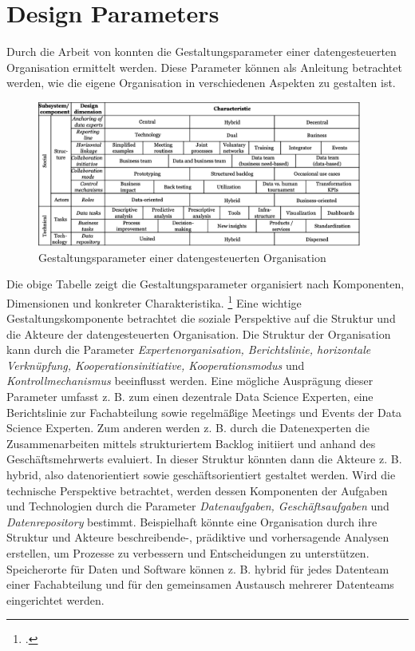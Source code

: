 \section{Design Parameters}

Durch die Arbeit von  konnten die Gestaltungsparameter einer datengesteuerten Organisation ermittelt werden.
Diese Parameter können als Anleitung betrachtet werden, wie die eigene Organisation in verschiedenen Aspekten zu gestalten ist.

\begin{figure}[htb]
    \centering
    \includegraphics[width=0.95\textwidth]{graphics/DDO_design.png}
    \caption{Gestaltungsparameter einer datengesteuerten Organisation}
    \label{fig:DDOs design}
\end{figure}

Die obige Tabelle zeigt die Gestaltungsparameter organisiert nach Komponenten, Dimensionen und konkreter Charakteristika. \footcite[Vgl.][S. 5]{JanineAdinaHagen.2020}
Eine wichtige Gestaltungskomponente betrachtet die soziale Perspektive auf die Struktur und die Akteure der datengesteuerten Organisation.
Die Struktur der Organisation kann durch die Parameter \textit{Expertenorganisation, Berichtslinie, horizontale Verknüpfung, Kooperationsinitiative, Kooperationsmodus} und \textit{Kontrollmechanismus} beeinflusst werden.
Eine mögliche Ausprägung dieser Parameter umfasst z. B. zum einen dezentrale Data Science Experten, eine Berichtslinie zur Fachabteilung sowie regelmäßige Meetings und Events der Data Science Experten.
Zum anderen werden z. B. durch die Datenexperten die Zusammenarbeiten mittels strukturiertem Backlog initiiert und anhand des Geschäftsmehrwerts evaluiert.
In dieser Struktur könnten dann die Akteure z. B. hybrid, also datenorientiert sowie geschäftsorientiert gestaltet werden.
Wird die technische Perspektive betrachtet, werden dessen Komponenten der Aufgaben und Technologien durch die Parameter \textit{Datenaufgaben, Geschäftsaufgaben} und \textit{Datenrepository} bestimmt.
Beispielhaft könnte eine Organisation durch ihre Struktur und Akteure beschreibende-, prädiktive und vorhersagende Analysen erstellen, um Prozesse zu verbessern und Entscheidungen zu unterstützen.
Speicherorte für Daten und Software können z. B. hybrid für jedes Datenteam einer Fachabteilung und für den gemeinsamen Austausch mehrerer Datenteams eingerichtet werden.

